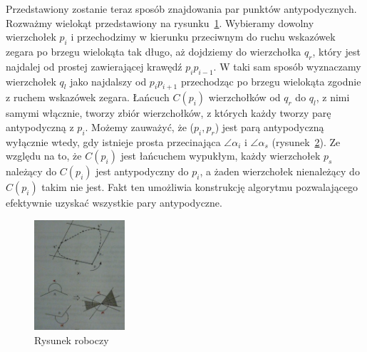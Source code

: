 \begin{figure}[htp]
  \centering
  \caption{\label{fig:antipodal}}
\end{figure}

Przedstawiony zostanie teraz sposób znajdowania par punktów
antypodycznych. Rozważmy wielokąt przedstawiony na
rysunku~\ref{fig:antipodal}. Wybieramy dowolny wierzchołek $p_i$ i
przechodzimy w kierunku przeciwnym do ruchu wskazówek zegara po brzegu
wielokąta tak długo, aż dojdziemy do wierzchołka $q_r$, który jest
najdalej od prostej zawierającej krawędź $p_{i}p_{i-1}$. W taki sam
sposób wyznaczamy wierzchołek $q_l$ jako najdalszy od $p_{i}p_{i+1}$
przechodząc po brzegu wielokąta zgodnie z ruchem wskazówek
zegara. Łańcuch $C(p_i)$ wierzchołków od $q_r$ do $q_l$, z nimi samymi
włącznie, tworzy zbiór wierzchołków, z których każdy tworzy parę
antypodyczną z $p_i$. Możemy zauważyć, że ($p_{i},p_{r}$) jest parą
antypodyczną wyłącznie wtedy, gdy istnieje prosta przecinająca $\angle
\alpha_i$ i $\angle \alpha_s$ (rysunek~\ref{fig:diameter}). Ze względu
na to, że $C(p_i)$ jest łańcuchem wypukłym, każdy wierzchołek $p_s$
należący do $C(p_i)$ jest antypodyczny do $p_i$, a żaden wierzchołek
nienależący do $C(p_i)$ takim nie jest. Fakt ten umożliwia konstrukcję
algorytmu pozwalającego efektywnie uzyskać wszystkie pary
antypodyczne.

\begin{figure}[htp]
  \centering
  \includegraphics[width=0.3\textwidth]{img/diameter}
  \caption{Rysunek roboczy\label{fig:diameter}}
\end{figure}

